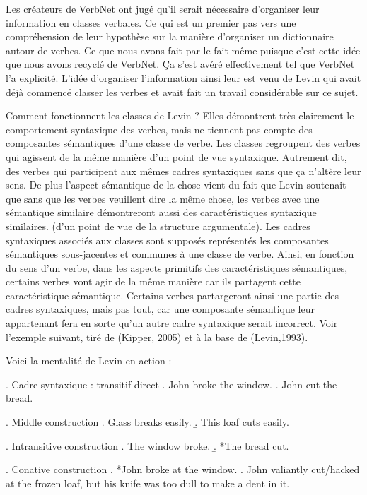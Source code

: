 \documentclass[12pt,maitrise,frenchb,natbib,twoside,initial]{dms}
\numberwithin{equation}{section}
\numberwithin{table}{chapter}
\numberwithin{figure}{chapter}
\begin{document}
Les créateurs de VerbNet ont jugé qu'il serait nécessaire d'organiser leur information en classes verbales. Ce qui est un premier pas vers une compréhension de leur hypothèse sur la manière d'organiser un dictionnaire autour de verbes. Ce que nous avons fait par le fait même puisque c'est cette idée que nous avons recyclé de VerbNet. Ça s'est avéré effectivement tel que VerbNet l'a explicité. L'idée d'organiser l'information ainsi leur est venu de Levin qui avait déjà commencé classer les verbes et avait fait un travail considérable sur ce sujet. 

Comment fonctionnent les classes de Levin ? Elles démontrent très clairement le comportement syntaxique des verbes, mais ne tiennent pas compte des composantes sémantiques d'une classe de verbe. Les classes regroupent des verbes qui agissent de la même manière d'un point de vue syntaxique. Autrement dit, des verbes qui participent aux mêmes cadres syntaxiques sans que ça n'altère leur sens. De plus l'aspect sémantique de la chose vient du fait que Levin soutenait que sans que les verbes veuillent dire la même chose, les verbes avec une sémantique similaire démontreront aussi des caractéristiques syntaxique similaires. (d'un point de vue de la structure argumentale). Les cadres syntaxiques associés aux classes sont supposés représentés les composantes sémantiques sous-jacentes et communes à une classe de verbe. Ainsi, en fonction du sens d'un verbe, dans les aspects primitifs des caractéristiques sémantiques, certains verbes vont agir de la même manière car ils partagent cette caractéristique sémantique. Certains verbes partargeront ainsi une partie des cadres syntaxiques, mais pas tout, car une composante sémantique leur appartenant fera en sorte qu'un autre cadre syntaxique serait incorrect. Voir l'exemple suivant, tiré de (Kipper, 2005) et à la base de (Levin,1993). 

Voici la mentalité de Levin en action :

\ex. \label{transitive} Cadre syntaxique : transitif direct
	\a. John broke the window.
	\b. John cut the bread.
	
\ex. \label{middle} Middle construction
	\a. Glass breaks easily.
	\b. This loaf cuts easily.
	
\ex. \label{intransitive} Intransitive construction
	\a. The window broke.
	\b. *The bread cut.

\ex. \label{conative} Conative construction
	\a. *John broke at the window.
	\b. John valiantly cut/hacked at the frozen loaf, but his knife was too dull to make a
dent in it.
\end{document}

